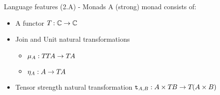 \documentclass{beamer}
\newcommand\script[1]{}
\begin{document}
\begin{frame}{Language features (2.A) - Monads}
        A (strong) monad consists of:
        \begin{itemize}
            \item A functor $T_{}{}: \mathbb{C}\rightarrow \mathbb{C}$
            \item Join and Unit natural transformations
            \begin{itemize}
                \item  $\mu_{A}: T_{}{T_{}{A}}\rightarrow T_{}{A}$
                \item $\eta_{A}: A\rightarrow T_{}{A}$
            \end{itemize}
            \item Tensor strength natural transformation $\texttt{t}_{A, B}: A\times T_{}{B}\rightarrow T_{}{(A\times B)}$
        \end{itemize}
        
        \script{
            - To handle effectful computations in a pure language like haskell, you need to use something called a monad.

            - This actually comes from when Moggi first discovered how to model effectful programs.
            - You need this structure of a functor from your category to itself, together with some natural transformation operations for creating and composing effectful operations.
            - If you squint a bit, they even look like the programming language monad definition.

            - An issue with haskell is that each monad only gives you one effect. If you want a program that does IO, contains state, has exceptions, and does non-determinism, you end up with a stack of monads.
            - This is still imprecise for meaningful analysis
        }


\end{frame}
\end{document}
